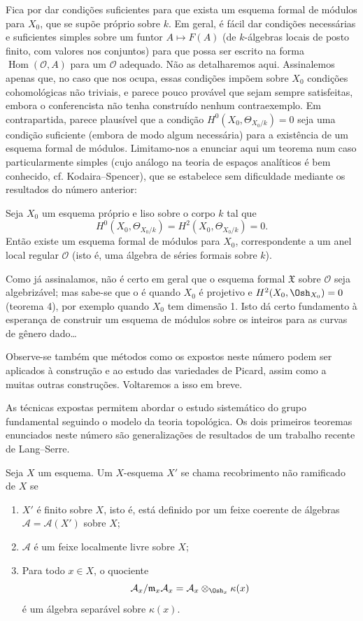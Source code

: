 Fica por dar condições suficientes para que exista um esquema formal de
módulos para $X_0$, que se supõe próprio sobre $k$. Em geral, é fácil dar
condições necessárias e suficientes simples sobre um funtor
$A\longmapsto F(A)$ (de $k$-álgebras locais de posto finito, com valores nos
conjuntos) para que possa ser escrito na forma
$\operatorname{Hom}(\mathcal O,A)$ para um $\mathcal O$ adequado. Não as
detalharemos aqui. Assinalemos apenas que, no caso que nos ocupa, essas
condições impõem sobre $X_0$ condições cohomológicas não triviais, e parece
pouco provável que sejam sempre satisfeitas, embora o conferencista não tenha
construído nenhum contraexemplo. Em contrapartida, parece plausível que a condição
$H^0(X_0,\Theta_{X_0/k})=0$ seja uma condição suficiente (embora de modo algum
necessária) para a existência de um esquema formal de módulos. Limitamo-nos a
enunciar aqui um teorema num caso particularmente simples (cujo análogo na
teoria de espaços analíticos é bem conhecido, cf. Kodaira--Spencer), que se
estabelece sem dificuldade mediante os resultados do número anterior:

 Seja $X_0$ um esquema próprio e liso sobre o corpo $k$
tal que
\[
  H^0(X_0,\Theta_{X_0/k})=H^2(X_0,\Theta_{X_0/k})=0.
\]
Então existe um esquema formal de módulos para $X_0$, correspondente a um
anel local regular $\mathcal O$ (isto é, uma álgebra de séries formais sobre
$k$).

Como já assinalamos, não é certo em geral que o esquema formal
$\mathfrak X$ sobre $\mathcal O$ seja algebrizável; mas sabe-se que o é
quando $X_0$ é projetivo e $H^2(X_0,\Osh_{X_0})=0$ (teorema 4), por exemplo
quando $X_0$ tem dimensão 1. Isto dá certo fundamento à esperança de
construir um esquema de módulos sobre os inteiros para as curvas de gênero
dado\ldots{}

Observe-se também que métodos como os expostos neste número podem ser aplicados
à construção e ao estudo das variedades de Picard, assim como a muitas
outras construções. Voltaremos a isso em breve.


As técnicas expostas permitem abordar o estudo sistemático do grupo
fundamental seguindo o modelo da teoria topológica. Os dois primeiros
teoremas enunciados neste número são generalizações de resultados de um
trabalho recente de Lang--Serre.

Seja $X$ um esquema. Um $X$-esquema $X'$ se chama recobrimento não ramificado de
$X$ se
\begin{enumerate}
  \item[\textit{i.}] $X'$ é finito sobre $X$, isto é, está definido por um
    feixe coerente de álgebras $\mathcal A=\mathcal A(X')$ sobre $X$;
  \item[\textit{ii.}] $\mathcal A$ é um feixe localmente livre sobre $X$;
  \item[\textit{iii.}] Para todo $x\in X$, o quociente
    \[
      \mathcal A_x/\mathfrak m_x\mathcal A_x
      =\mathcal A_x\otimes_{\Osh_x}\kappa(x)
    \]
    é um álgebra separável sobre $\kappa(x)$.
\end{enumerate}

